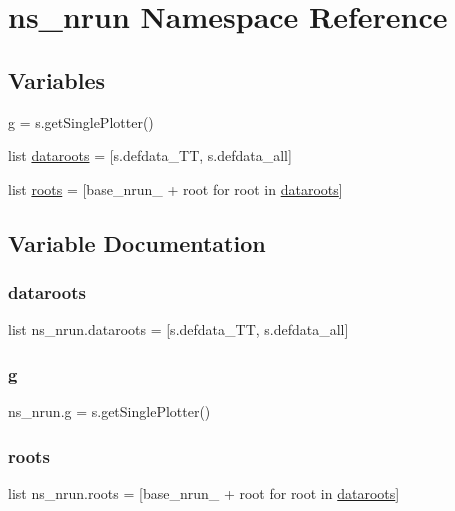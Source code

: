 \hypertarget{namespacens__nrun}{}\section{ns\+\_\+nrun Namespace Reference}
\label{namespacens__nrun}
\subsection*{Variables}
\begin{DoxyCompactItemize}
\item 
\mbox{\hyperlink{namespacens__nrun_a5769a8d9ef2d381fba3fa18b3df88520}{g}} = s.\+get\+Single\+Plotter()
\item 
list \mbox{\hyperlink{namespacens__nrun_ae31b7e2793118dba5d1fa47bec400877}{dataroots}} = \mbox{[}s.\+defdata\+\_\+\+TT, s.\+defdata\+\_\+all\mbox{]}
\item 
list \mbox{\hyperlink{namespacens__nrun_a40e71bdeaf23b3c80bb8aa9350e6358c}{roots}} = \mbox{[}\textquotesingle{}base\+\_\+nrun\+\_\+\textquotesingle{} + root for root in \mbox{\hyperlink{namespacens__nrun_ae31b7e2793118dba5d1fa47bec400877}{dataroots}}\mbox{]}
\end{DoxyCompactItemize}


\subsection{Variable Documentation}
\mbox{\label{namespacens__nrun_ae31b7e2793118dba5d1fa47bec400877}} 
\subsubsection{\texorpdfstring{dataroots}{dataroots}}
{\footnotesize\ttfamily list ns\+\_\+nrun.\+dataroots = \mbox{[}s.\+defdata\+\_\+\+TT, s.\+defdata\+\_\+all\mbox{]}}

\mbox{\label{namespacens__nrun_a5769a8d9ef2d381fba3fa18b3df88520}} 
\subsubsection{\texorpdfstring{g}{g}}
{\footnotesize\ttfamily ns\+\_\+nrun.\+g = s.\+get\+Single\+Plotter()}

\mbox{\label{namespacens__nrun_a40e71bdeaf23b3c80bb8aa9350e6358c}} 
\subsubsection{\texorpdfstring{roots}{roots}}
{\footnotesize\ttfamily list ns\+\_\+nrun.\+roots = \mbox{[}\textquotesingle{}base\+\_\+nrun\+\_\+\textquotesingle{} + root for root in \mbox{\hyperlink{namespacens__nrun_ae31b7e2793118dba5d1fa47bec400877}{dataroots}}\mbox{]}}

